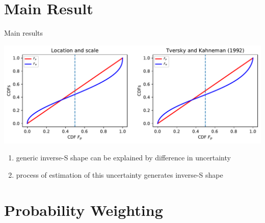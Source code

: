 \section{Main Result}

\begin{frame}{Main results}
\begin{center}
	\includegraphics[width=.9\textwidth]{../../figs/Our_result_LocScale_vs_KT.pdf}
\end{center}
\begin{enumerate}
	\item	generic inverse-S shape can be explained by difference in uncertainty
	\item process of estimation of this uncertainty generates inverse-S shape
\end{enumerate}
\label{MainResults}
\hyperlink{weight_vs_estimate}{}
\end{frame}

\section{Probability Weighting}

